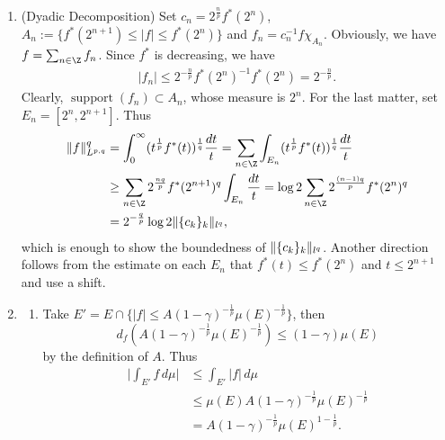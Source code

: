 \begin{enumerate}
\item[1.4.13.]
   (Dyadic Decomposition)  
   Set $c_{n}=2^{\frac{n}{p}}f^{*}(2^{n})$, 
   $A_{n}:=\{f^{*}(2^{n+1}) \leq |f| \leq f^{*}(2^{n})\}$ 
   and $f_{n}=c_{n}^{-1}f\chi_{A_{n}}$. 
   Obviously, we have $f=\sum_{n \in \Z}f_{n}$. 
   Since $f^{*}$ is decreasing, we have
   \begin{equation*}\begin{aligned}
   |f_{n}| \leq 2^{-\frac{n}{p}}f^{*}(2^{n})^{-1}f^{*}(2^{n}) = 2^{-\frac{n}{p}}.
   \end{aligned}\end{equation*}
   Clearly, $\operatorname{support}(f_{n}) \subset A_{n}$, whose measure is $2^{n}$. 
   For the last matter, set $E_{n}=[2^{n},2^{n+1}]$. Thus
   \begin{equation*}\begin{aligned}
   \norm{f}_{L^{p,q}}^{q} &= \int_{0}^{\infty}(t^{\frac{1}{p}}f^{*}(t))^{\frac{1}{q}}\frac{dt}{t} 
   = \sum_{n \in \Z} \int_{E_{n}}(t^{\frac{1}{p}}f^{*}(t))^{\frac{1}{q}}\frac{dt}{t}
   \\&\geq \sum_{n \in \Z} 2^{\frac{nq}{p}}f^{*}(2^{n+1})^{q}\int_{E_{n}}\frac{dt}{t} 
   = \log 2 \sum_{n \in \Z} 2^{\frac{(n-1)q}{p}}f^{*}(2^{n})^{q}
   \\&= 2^{-\frac{q}{p}}\log 2 \norm{\{c_{k}\}_{k}}_{l^{q}},
   \end{aligned}\end{equation*}
   which is enough to show the boundedness of $\Vert \{c_{k}\}_{k} \Vert_{l^{q}}$. 
   Another direction follows from the estimate on each $E_{n}$ 
   that $f^{*}(t) \leq f^{*}(2^{n})$ and $t \leq 2^{n+1}$ and use a shift.

\item[1.4.14. ]
   \begin{enumerate}
   \item[(a)] Take $E'=E \cap \{|f| \leq A(1-\gamma)^{-\frac{1}{p}}\mu(E)^{-\frac{1}{p}}\}$, then 
   $$d_{f}(A(1-\gamma)^{-\frac{1}{p}}\mu(E)^{-\frac{1}{p}}) 
   \leq (1-\gamma)\mu(E)$$ 
   by the definition of $A$. Thus
   \begin{equation*}\begin{aligned}
   \bigg|\int_{E'}f\,d\mu\bigg| &\leq \int_{E'}|f|\,d\mu \\
   &\leq \mu(E)A(1-\gamma)^{-\frac{1}{p}}\mu(E)^{-\frac{1}{p}} \\
   &= A(1-\gamma)^{-\frac{1}{p}}\mu(E)^{1-\frac{1}{p}}.
   \end{aligned}\end{equation*}
   

\end{enumerate}
\end{enumerate}
